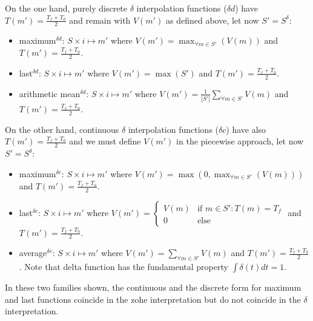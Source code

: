 On the one hand, purely discrete $\delta$ interpolation functions
($\delta d$) have $T(m')=\frac{T_f+T_0}{2}$ and remain with $V(m')$ as
defined above, let now $S'=S^{\delta}$:
\begin{itemize}
\item maximum$^{\delta d}$: $S \times i \mapsto m'$ where $V(m') =
  \max_{\forall m \in S'}(V(m))$ and $T(m')=\frac{T_f+T_0}{2}$.
\item last$^{\delta d}$: $S \times i \mapsto m'$ where $V(m') =
  \max(S')$ and $T(m')=\frac{T_f+T_0}{2}$.
\item arithmetic mean$^{\delta d}$: $S \times i \mapsto m'$ where $V(m')
  = \frac{1}{|S'|} \sum\limits_{\forall m\in S'} V(m)$ and
  $T(m')=\frac{T_f+T_0}{2}$. 
\end{itemize}
On the other hand, continuous $\delta$ interpolation functions
($\delta c$) have also $T(m')=\frac{T_f+T_0}{2}$ and we must define
$V(m')$ in the piecewise approach, let now $S'=S^{\delta}$:
\begin{itemize}
\item maximum$^{\delta c}$: $S \times i \mapsto m'$ where $V(m') = \max(0,
  \max_{\forall m \in S'}(V(m)))$ and $T(m')=\frac{T_f+T_0}{2}$.
\item last$^{\delta c}$: $S \times i \mapsto m'$ where $V(m') = 
\begin{cases}
V(m) & \text{if } m\in S':T(m)=T_f \\
0 & \text{else}
\end{cases}$ and $T(m')=\frac{T_f+T_0}{2}$.
\item average$^{\delta c}$: $S \times i \mapsto m'$ where $V(m') =
  \sum\limits_{\forall m \in S'} V(m)$ and
  $T(m')=\frac{T_f+T_0}{2}$. Note that delta function has the
  fundamental property $\int \delta(t)dt = 1$.
\end{itemize}

In these two families shown, the continuous and the discrete form for
maximum and last functions coincide in the zohe interpretation but do
not coincide in the $\delta$ interpretation. 












